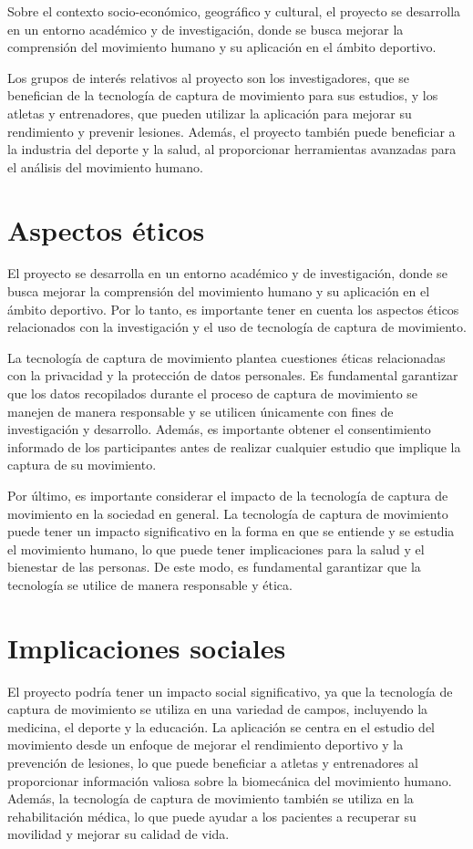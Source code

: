 Sobre el contexto socio-económico, geográfico y cultural, el proyecto se desarrolla en un entorno académico y de investigación, donde se busca mejorar la comprensión del movimiento humano y su aplicación en el ámbito deportivo. 

Los grupos de interés relativos al proyecto son los investigadores, que se benefician de la tecnología de captura de movimiento para sus estudios, y los atletas y entrenadores, que pueden utilizar la aplicación para mejorar su rendimiento y prevenir lesiones. Además, el proyecto también puede beneficiar a la industria del deporte y la salud, al proporcionar herramientas avanzadas para el análisis del movimiento humano.

\section{Aspectos éticos}

El proyecto se desarrolla en un entorno académico y de investigación, donde se busca mejorar la comprensión del movimiento humano y su aplicación en el ámbito deportivo. Por lo tanto, es importante tener en cuenta los aspectos éticos relacionados con la investigación y el uso de tecnología de captura de movimiento.

La tecnología de captura de movimiento plantea cuestiones éticas relacionadas con la privacidad y la protección de datos personales. Es fundamental garantizar que los datos recopilados durante el proceso de captura de movimiento se manejen de manera responsable y se utilicen únicamente con fines de investigación y desarrollo. Además, es importante obtener el consentimiento informado de los participantes antes de realizar cualquier estudio que implique la captura de su movimiento.

Por último, es importante considerar el impacto de la tecnología de captura de movimiento en la sociedad en general. La tecnología de captura de movimiento puede tener un impacto significativo en la forma en que se entiende y se estudia el movimiento humano, lo que puede tener implicaciones para la salud y el bienestar de las personas. De este modo, es fundamental garantizar que la tecnología se utilice de manera responsable y ética.

\section{Implicaciones sociales}

El proyecto podría tener un impacto social significativo, ya que la tecnología de captura de movimiento se utiliza en una variedad de campos, incluyendo la medicina, el deporte y la educación. La aplicación se centra en el estudio del movimiento desde un enfoque de mejorar el rendimiento deportivo y la prevención de lesiones, lo que puede beneficiar a atletas y entrenadores al proporcionar información valiosa sobre la biomecánica del movimiento humano. Además, la tecnología de captura de movimiento también se utiliza en la rehabilitación médica, lo que puede ayudar a los pacientes a recuperar su movilidad y mejorar su calidad de vida.


